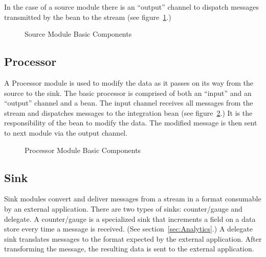 \par

In the case of a source module there is an ``output'' channel to dispatch messages 
transmitted by the bean to the stream (see figure~\ref{fig:sourcembc}.)

\par

\begin{figure}[ht]
\centering
{}
\caption{Source Module Basic Components}
\label{fig:sourcembc}
\end{figure}

\par

\subsection{Processor}
\label{sec:Processor}
A Processor module is used to modify the data as it passes on its way from the source to
the sink.  The basic processor is comprised of both an ``input'' and an ``output'' channel
and a bean.
The input channel receives all messages from the stream and dispatches
messages to the integration bean (see figure~\ref{fig:processormbc}.) It is the responsibility of
the bean to modify the data. The modified message is then sent to next module 
via the output channel.  

\par

\begin{figure}
\centering
{}
\caption{Processor Module Basic Components}
\label{fig:processormbc}
\end{figure}

\par

\subsection{Sink}
\label{sec:Sink}
Sink modules convert and deliver messages from a stream in a format consumable by 
an external application.  There are two types of sinks: counter/gauge and delegate.
A counter/gauge is a specialized sink that increments a field on a data store every time a
message is received. (See section~\ref{sec:Analytics}.) A delegate
sink translates messages to the format expected by the external application.
After transforming the message, the resulting data is sent to the external application.

